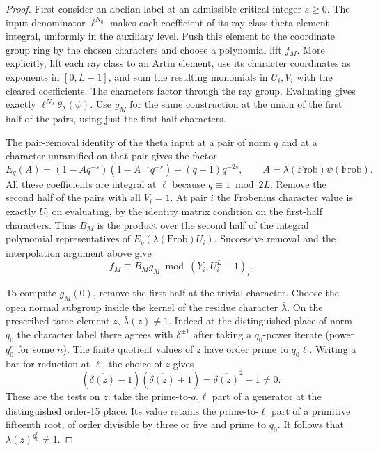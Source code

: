 \begin{proof}
First consider an abelian label at an admissible critical
integer \(s\ge0\). The input denominator \(\ell^{N_0}\)
makes each coefficient of its ray-class theta element integral,
uniformly in the auxiliary level. Push this element to the
coordinate group ring by the chosen characters and choose a
polynomial lift \(f_M\). More explicitly, lift each ray class
to an Artin element, use its character coordinates as exponents
in \([0,L-1]\), and sum the resulting monomials in \(U_i,V_i\)
with the cleared coefficients. The characters factor through
the ray group. Evaluating gives exactly
\(\ell^{N_0}\theta_\lambda(\psi)\). Use \(g_M\) for the
same construction at the union of the first half of the pairs,
using just the first-half characters.

The pair-removal identity of the theta input at a pair of
norm \(q\) and at a character unramified on that pair gives
the factor
\[
 E_q(A)=(1-Aq^{-s})(1-A^{-1}q^{-s})+(q-1)q^{-2s},
 \qquad A=\lambda(\mathrm{Frob})\psi(\mathrm{Frob}).
\]
All these coefficients are integral at \(\ell\) because
\(q\equiv1\bmod 2L\). Remove the second half of the pairs
with all \(V_i=1\). At pair \(i\) the Frobenius character
value is exactly \(U_i\) on evaluating, by the identity
matrix condition on the first-half characters. Thus \(B_M\)
is the product over the second half of the integral polynomial
representatives of \(E_q(\lambda(\mathrm{Frob})U_i)\).
Successive removal and the interpolation argument above give
\[
 f_M\equiv B_Mg_M\bmod(Y_i,U_i^L-1)_i.
\]


To compute \(g_M(0)\), remove the first half at the trivial
character. Choose the open normal subgroup inside the kernel
of the residue character \(\bar\lambda\). On the prescribed
tame element \(z\), \(\bar\lambda(z)\ne1\). Indeed at the
distinguished place of norm \(q_0\) the character label there
agrees with \(\delta^{\pm1}\) after taking a \(q_0\)-power
iterate (power \(q_0^n\) for some \(n\)). The finite
quotient values of \(z\) have order prime to \(q_0\ell\).
Writing a bar for reduction at \(\ell\), the choice of \(z\) gives
\[
 (\overline{\delta(z)}-1)(\overline{\delta(z)}+1)=\overline{\delta(z)}^2-1\ne0.
\]
These are the tests on \(z\): take the
prime-to-\(q_0\ell\) part of a generator at the distinguished
order-15 place. Its value retains the prime-to-\(\ell\)
part of a primitive fifteenth root, of order divisible by
three or five and prime to \(q_0\). It follows that
\(\bar\lambda(z)^{q_0^n}\ne1\).


\end{proof}
